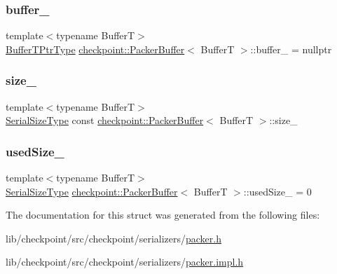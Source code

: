 \subsubsection{\texorpdfstring{buffer\+\_\+}{buffer\_}}
{\footnotesize\ttfamily template$<$typename BufferT$>$ \\
\hyperlink{structcheckpoint_1_1_packer_buffer_a081ec628050e8b173e413271fa070c26}{Buffer\+T\+Ptr\+Type} \hyperlink{structcheckpoint_1_1_packer_buffer}{checkpoint\+::\+Packer\+Buffer}$<$ BufferT $>$\+::buffer\+\_\+ = nullptr\hspace{0.3cm}{\ttfamily [private]}}

\mbox{\label{structcheckpoint_1_1_packer_buffer_aac4e52e04c38fd611a6ed75e0d0df0a2}} 
\subsubsection{\texorpdfstring{size\+\_\+}{size\_}}
{\footnotesize\ttfamily template$<$typename BufferT$>$ \\
\hyperlink{namespacecheckpoint_a083f6674da3f94c2901b18c6d238217c}{Serial\+Size\+Type} const \hyperlink{structcheckpoint_1_1_packer_buffer}{checkpoint\+::\+Packer\+Buffer}$<$ BufferT $>$\+::size\+\_\+\hspace{0.3cm}{\ttfamily [private]}}

\mbox{\label{structcheckpoint_1_1_packer_buffer_ae20a1bc8f41e3af7e5b8ee3951f31353}} 
\subsubsection{\texorpdfstring{used\+Size\+\_\+}{usedSize\_}}
{\footnotesize\ttfamily template$<$typename BufferT$>$ \\
\hyperlink{namespacecheckpoint_a083f6674da3f94c2901b18c6d238217c}{Serial\+Size\+Type} \hyperlink{structcheckpoint_1_1_packer_buffer}{checkpoint\+::\+Packer\+Buffer}$<$ BufferT $>$\+::used\+Size\+\_\+ = 0\hspace{0.3cm}{\ttfamily [private]}}



The documentation for this struct was generated from the following files\+:\begin{DoxyCompactItemize}
\item 
lib/checkpoint/src/checkpoint/serializers/\hyperlink{packer_8h}{packer.\+h}\item 
lib/checkpoint/src/checkpoint/serializers/\hyperlink{packer_8impl_8h}{packer.\+impl.\+h}\end{DoxyCompactItemize}
